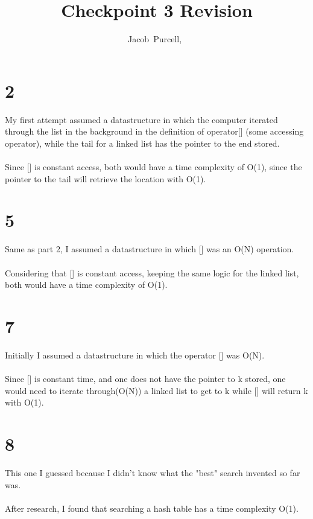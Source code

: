 \documentclass[journal]{IEEEtran}
\begin{document}
\title{Checkpoint 3 Revision}

\author{Jacob~Purcell,~}

\maketitle
\section{2}

My first attempt assumed a datastructure in which
the computer iterated through the list in the background in 
the definition of operator[] (some accessing operator), while the tail for a linked list 
has the pointer to the end stored. 
\\\\
Since [] is constant access, both would have a time complexity of O(1), since the 
pointer to the tail will retrieve the location with O(1).

\section{5}

Same as part 2, I assumed a datastructure in which [] was an O(N) operation.
\\\\
Considering that [] is constant access, keeping the same logic for the linked list,
 both would have a time complexity of O(1).

\section{7}

Initially I assumed a datastructure in which the operator [] was O(N). 
\\\\
Since [] is constant time, and one does not have the pointer to k stored, 
one would need to iterate through(O(N)) a linked list to get to k while [] will return k with O(1).

\section{8}

This one I guessed because I didn't know what the "best" search invented so far was.
\\\\
After research, I found that searching a hash table has a time complexity O(1).
\end{document}
